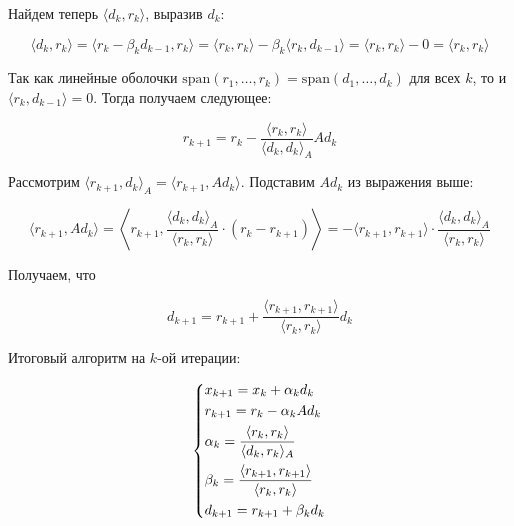 Найдем теперь $\langle d_k, r_k \rangle$, выразив $d_k$:

\[
\langle d_k, r_k \rangle = \langle r_k - \beta_k d_{k-1}, r_k \rangle = \langle r_k, r_k \rangle - \beta_k \langle r_k, d_{k-1} \rangle = \langle r_k, r_k \rangle - 0 = \langle r_k, r_k \rangle
\]

Так как линейные оболочки $\mathrm{span}(r_1, \ldots, r_k) = \mathrm{span}(d_1, \ldots, d_k)$ для всех $k$, то и $\langle r_k, d_{k-1} \rangle = 0$. Тогда получаем следующее:

\[
r_{k+1} = r_k - \frac{\langle r_k, r_k \rangle}{\langle d_k, d_k \rangle_A} A d_k
\]

Рассмотрим $\langle r_{k+1}, d_k \rangle_A = \langle r_{k+1}, A d_k \rangle$. Подставим $A d_k$ из выражения выше:

\[
\langle r_{k+1}, A d_k \rangle =
%
\left\langle
r_{k+1}, \frac{\langle d_k, d_k \rangle_A}{\langle r_k, r_k \rangle} \cdot (r_k - r_{k+1})
\right\rangle =
-\langle r_{k+1}, r_{k+1} \rangle \cdot  \frac{\langle d_k, d_k \rangle_A}{\langle r_k, r_k \rangle}
\]

Получаем, что

\[
d_{k+1} = r_{k+1} + \frac{\langle r_{k+1}, r_{k+1} \rangle}{\langle r_k, r_k \rangle} d_k
\]

Итоговый алгоритм на $k$-ой итерации:

\begin{equation*}
    \begin{dcases*}
        x_{k+1} = x_k + \alpha_k d_k\\
        r_{k+1} = r_k - \alpha_k A d_k\\
        \alpha_k = \frac{\langle r_k, r_k \rangle}{\langle d_k, r_k \rangle_A}\\
        \beta_k = \frac{\langle r_{k+1}, r_{k+1} \rangle}{\langle r_k, r_k \rangle}\\
        d_{k+1} = r_{k+1} + \beta_k d_k
    \end{dcases*}
\end{equation*}
